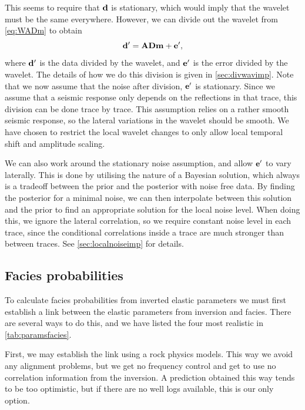 This seems to require that $\mathbf{d}$ is stationary, which would imply
that the wavelet must be the same everywhere. However, we can divide
out the wavelet from \autoref{eq:WADm} to obtain 
\begin{equation}
\label{eq:ADm}
\mathbf{d^\prime} = \mathbf{A}\mathbf{D}\mathbf{m} + \mathbf{e^\prime},
\end{equation}
where $\mathbf{d^\prime}$ is the data divided by the wavelet, and
$\mathbf{e^\prime}$ is the error divided by the wavelet. The details of
how we do this division is given in \autoref{sec:divwavimp}. Note that
we now assume that the noise after division, $\mathbf{e^\prime}$ is
stationary. Since we assume that a seismic response only depends on
the reflections in that trace, this division can be done trace by
trace. This assumption relies on a rather smooth seismic response, so
the lateral variations in the wavelet should be smooth. We have chosen
to restrict the local wavelet changes to only allow local temporal
shift and amplitude scaling. 

We can also work around the stationary noise assumption, and allow
$\mathbf{e^\prime}$ to vary laterally. This is done by utilising the
nature of a Bayesian solution, which always is a tradeoff between the
prior and the posterior with noise free data. By finding the posterior
for a minimal noise, we can then interpolate between this solution and
the prior to find an appropriate solution for the local noise
level. When doing this, we ignore the lateral correlation, so we
require constant noise level in each trace, since the conditional
correlations inside a trace are much stronger than between traces. See
\autoref{sec:localnoiseimp} for details. 

\subsection{Facies probabilities}
\label{sec:facprobthe}
To calculate facies probabilities from inverted elastic parameters we
must first establish a link between the elastic parameters from
inversion and facies. There are several ways to do this, and we have
listed the four most realistic in 
\autoref{tab:paramsfacies}.

First, we may establish the link using a rock physics models. This
way we avoid any alignment problems, but we get no frequency control
and get to use no correlation information from the
inversion. A prediction obtained this way tends to be too
optimistic, but if there are no well logs available, this is our only
option.

